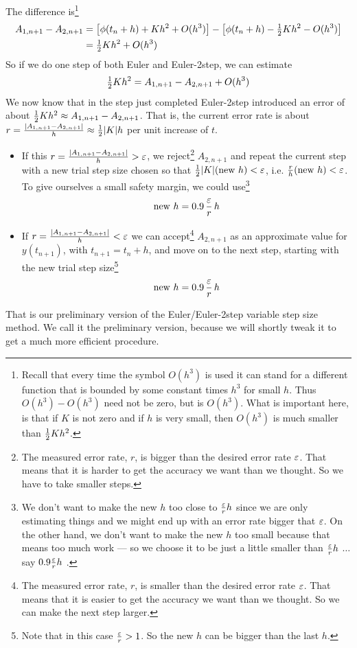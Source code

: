 The difference is\footnote{Recall that every time the symbol $O(h^3)$ is 
used it can stand for a different function that is bounded by some 
constant times $h^3$ for small $h$. Thus $O(h^3)-O(h^3)$ need not be zero, 
but is $O(h^3)$. What is important here, is that if $K$ is not zero and if $h$ is very small, then $O(h^3)$ is much smaller than $\tfrac{1}{2} Kh^2$.}
\begin{align*}
A_{1,n+1}-A_{2,n+1}&=\big[\phi(t_n+h)+Kh^2+O(h^3)\big]
             -\big[\phi(t_n+h)-\tfrac{1}{2} Kh^2-O(h^3)\big] \\
&=\tfrac{1}{2} Kh^2+O(h^3)
\end{align*}
So if we do one step of both Euler and Euler-2step, we can estimate
\begin{equation*}
\tfrac{1}{2} Kh^2=A_{1,n+1}-A_{2,n+1}+O(h^3)
\end{equation*}
We now know that in the step just completed Euler-2step introduced an error 
of about  $\tfrac{1}{2} Kh^2\approx A_{1,n+1}-A_{2,n+1}$. 
That is, the current error rate is about
$r=\frac{|A_{1,n+1}-A_{2,n+1}|}{h}\approx\tfrac{1}{2} |K| h$ per unit increase of $t$.
\begin{itemize}
\item  
If this $r=\frac{|A_{1,n+1}-A_{2,n+1}|}{h}>\varepsilon$, we reject\footnote{The measured error rate, $r$,  is bigger than the desired error rate $\varepsilon$. That means that it is harder to get the accuracy we want than we thought. So we have to take smaller steps.} $A_{2,n+1}$ 
and repeat the current step with a new trial step size chosen so that 
$\tfrac{1}{2} |K|(\text{new }h)<\varepsilon$, i.e. $\frac{r}{h}(\text{new }h)<\varepsilon$. 
To give ourselves a small safety margin, we could use\footnote{We don't want to make the new $h$ too close to $\frac{\varepsilon}{r}{h}$ since we are only estimating things and we might end up with an error rate bigger that $\varepsilon$. On the other hand, we don't want to make the new $h$ too small because that means too
much work --- so we choose it to be just a little smaller than $\frac{\varepsilon}{r}{h}$ $\ldots$ say $0.9\frac{\varepsilon}{r}{h}$ .} 
\begin{equation*}
\text{new }h=0.9\,\frac{\varepsilon}{r}\,h
\end{equation*}
\item
If $r=\frac{|A_{1,n+1}-A_{2,n+1}|}{h}<\varepsilon$ we can accept\footnote{The measured error rate, $r$,  is smaller than the desired error rate $\varepsilon$. That means that it is easier to get the accuracy we want than we thought. So we can make the next step larger.} 
$A_{2,n+1}$ as an approximate  value for $y(t_{n+1})$, with $t_{n+1}=t_n+h$, 
and move on to the next step, starting with the new trial step size\footnote{Note that in this case $\frac{\varepsilon}{r}>1$. So the new $h$ can be bigger than the last $h$.} 
\begin{equation*}
\text{new } h=0.9\,\frac{\varepsilon}{r}\,h
\end{equation*}
\end{itemize}
That is our preliminary version of the Euler/Euler-2step variable step size method. We call it the preliminary version, because we will shortly tweak it 
to get a much more efficient procedure.

